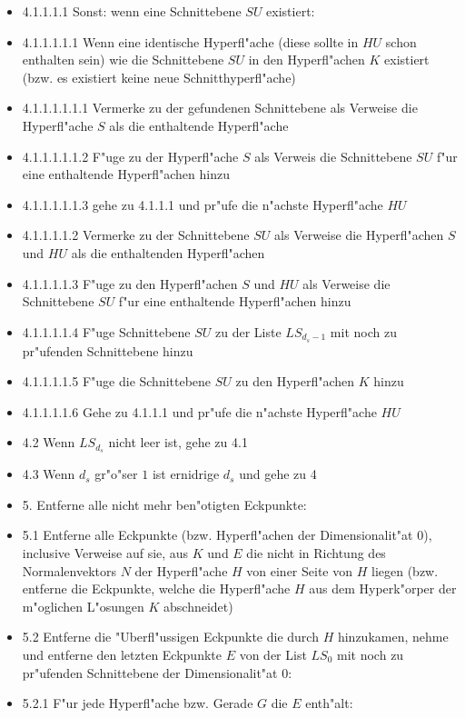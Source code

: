 \begin{itemize}
 \item [] 4.1.1.1.1 Sonst: wenn eine Schnittebene $SU$ existiert:
 \item [] 4.1.1.1.1.1 Wenn eine identische Hyperfl"ache (diese sollte in $HU$ schon enthalten sein) wie die Schnittebene $SU$ in den Hyperfl"achen $K$ existiert (bzw. es existiert keine neue Schnitthyperfl"ache)
 \item [] 4.1.1.1.1.1.1 Vermerke zu der gefundenen Schnittebene als Verweise die Hyperfl"ache $S$ als die enthaltende Hyperfl"ache
 \item [] 4.1.1.1.1.1.2 F"uge zu der Hyperfl"ache $S$ als Verweis die Schnittebene $SU$ f"ur eine enthaltende Hyperfl"achen hinzu
 \item [] 4.1.1.1.1.1.3 gehe zu 4.1.1.1 und pr"ufe die n"achste Hyperfl"ache $HU$
 \item [] 4.1.1.1.1.2 Vermerke zu der Schnittebene $SU$ als Verweise die Hyperfl"achen $S$ und $HU$ als die enthaltenden Hyperfl"achen
 \item [] 4.1.1.1.1.3 F"uge zu den Hyperfl"achen $S$ und $HU$ als Verweise die Schnittebene $SU$ f"ur eine enthaltende Hyperfl"achen hinzu
 \item [] 4.1.1.1.1.4 F"uge Schnittebene $SU$ zu der Liste $LS_{d_s-1}$ mit noch zu pr"ufenden Schnittebene hinzu
 \item [] 4.1.1.1.1.5 F"uge die Schnittebene $SU$ zu den Hyperfl"achen $K$ hinzu
 \item [] 4.1.1.1.1.6 Gehe zu 4.1.1.1 und pr"ufe die n"achste Hyperfl"ache $HU$
 \item [] 4.2 Wenn $LS_{d_s}$ nicht leer ist, gehe zu 4.1
 \item [] 4.3 Wenn $d_s$ gr"o"ser $1$ ist ernidrige $d_s$ und gehe zu 4
 \item [] 5. Entferne alle nicht mehr ben"otigten Eckpunkte:
 \item [] 5.1 Entferne alle Eckpunkte (bzw. Hyperfl"achen der Dimensionalit"at 0), inclusive Verweise auf sie, aus $K$ und $E$ die nicht in Richtung des Normalenvektors $N$ der Hyperfl"ache $H$ von einer Seite von $H$ liegen (bzw. entferne die Eckpunkte, welche die Hyperfl"ache $H$ aus dem Hyperk"orper der m"oglichen L"osungen $K$ abschneidet)
 \item [] 5.2 Entferne die "Uberfl"ussigen Eckpunkte die durch $H$ hinzukamen, nehme und entferne den letzten Eckpunkte $E$ von der List $LS_{0}$  mit noch zu pr"ufenden Schnittebene der Dimensionalit"at $0$:
 \item [] 5.2.1 F"ur jede Hyperfl"ache bzw. Gerade $G$ die $E$ enth"alt:

\end{itemize}
